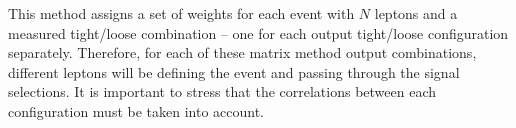 This method assigns a set of weights for each event with $N$ leptons and a measured tight/loose combination -- one for each output tight/loose configuration separately. Therefore, for each of these matrix method output combinations, different leptons will be defining the event and passing through the signal selections. It is important to stress that the correlations between each configuration must be taken into account.
%
%

